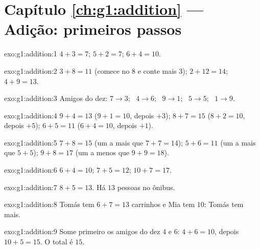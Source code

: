 \section*{Capítulo \ref{ch:g1:addition} --- Adição: primeiros passos}

\begin{solution}{exo:g1:addition:1}
$4 + 3 = 7$; \quad $5 + 2 = 7$; \quad $6 + 4 = 10$.
\end{solution}

\begin{solution}{exo:g1:addition:2}
$3 + 8 = 11$ (comece no $8$ e conte mais $3$); \quad
$2 + 12 = 14$; \quad $4 + 9 = 13$.
\end{solution}

\begin{solution}{exo:g1:addition:3}
Amigos do dez: $7 \to 3$; \ $4 \to 6$; \ $9 \to 1$; \ $5 \to 5$;
\ $1 \to 9$.
\end{solution}

\begin{solution}{exo:g1:addition:4}
$9 + 4 = 13$ ($9 + 1 = 10$, depois $+3$); \quad
$8 + 7 = 15$ ($8 + 2 = 10$, depois $+5$); \quad
$6 + 5 = 11$ ($6 + 4 = 10$, depois $+1$).
\end{solution}

\begin{solution}{exo:g1:addition:5}
$7 + 8 = 15$ (um a mais que $7 + 7 = 14$); \quad
$5 + 6 = 11$ (um a mais que $5 + 5$); \quad
$9 + 8 = 17$ (um a menos que $9 + 9 = 18$).
\end{solution}

\begin{solution}{exo:g1:addition:6}
$6 + 4 = 10$; \quad $7 + 5 = 12$; \quad $10 + 7 = 17$.
\end{solution}

\begin{solution}{exo:g1:addition:7}
$8 + 5 = 13$. Há $13$ pessoas no ônibus.
\end{solution}

\begin{solution}{exo:g1:addition:8}
Tomás tem $6 + 7 = 13$ carrinhos e Mia tem $10$: Tomás tem mais.
\end{solution}

\begin{solution}{exo:g1:addition:9}
Some primeiro os amigos do dez $4$ e $6$: $4 + 6 = 10$, depois
$10 + 5 = 15$. O total é $15$.
\end{solution}
